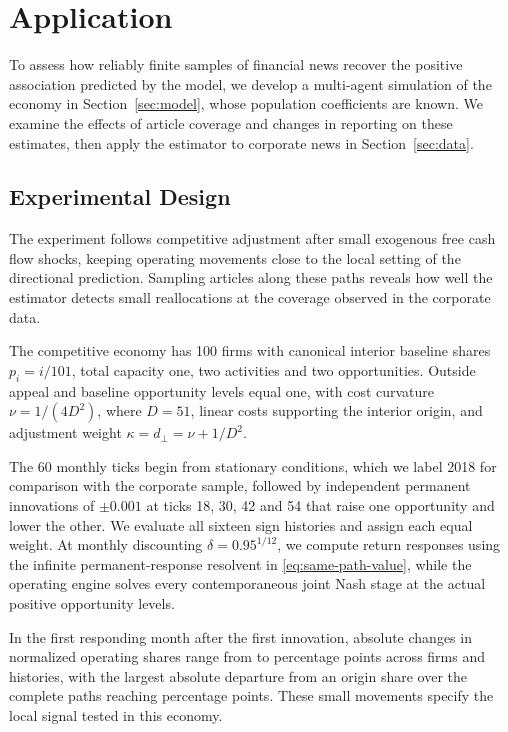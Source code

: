 \section{Application}\label{sec:application}\label{sec:simulation}

To assess how reliably finite samples of financial news recover the positive association
predicted by the model, we develop a multi-agent simulation of the economy in
Section~\ref{sec:model}, whose population coefficients are known.
We examine the effects of article coverage and changes in reporting on these
estimates, then apply the estimator to corporate news in
Section~\ref{sec:data}.

\subsection{Experimental Design}\label{sec:simulation-design}

The experiment follows competitive adjustment after small exogenous free
cash flow shocks,
keeping operating movements close to the local setting of the directional
prediction.
Sampling articles along these paths reveals how well the estimator detects
small reallocations at the coverage observed in the corporate data.

The competitive economy has 100 firms with canonical interior baseline
shares $p_i=i/101$, total
capacity one, two activities and two opportunities.
Outside appeal and baseline opportunity levels equal one, with cost curvature
$\nu=1/(4D^2)$, where $D=51$, linear costs supporting the interior origin,
and adjustment weight $\kappa=d_\perp=\nu+1/D^2$.

The 60 monthly ticks begin from stationary conditions, which we label 2018 for
comparison with the corporate sample, followed by independent
permanent innovations of $\pm0.001$ at ticks 18, 30, 42 and 54 that raise one
opportunity and lower the other.
We evaluate all sixteen sign histories and assign each equal weight.
At monthly discounting $\delta=0.95^{1/12}$, we compute return responses using
the infinite permanent-response resolvent in \eqref{eq:same-path-value}, while the
operating engine solves every contemporaneous joint Nash stage at the actual
positive opportunity levels.

In the first responding month after the first innovation, absolute changes
in normalized operating shares range from
 to
percentage points across firms and histories, with the largest absolute departure
from an origin share over the complete paths reaching
 percentage points.
These small movements specify the local signal tested in this economy.

